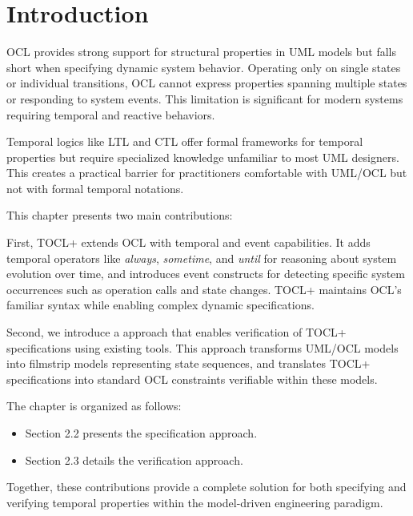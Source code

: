 \section{Introduction}

\hspace{1cm} OCL provides strong support for structural properties in UML models but 
falls short when specifying dynamic system behavior. Operating only on single states 
or individual transitions, OCL cannot express properties spanning multiple states or 
responding to system events. This limitation is significant for modern systems 
requiring temporal and reactive behaviors.

Temporal logics like LTL and CTL offer formal frameworks for temporal properties but 
require specialized knowledge unfamiliar to most UML designers. This creates a practical 
barrier for practitioners comfortable with UML/OCL but not with formal temporal notations.

This chapter presents two main contributions:

First, TOCL+ extends OCL with temporal and event capabilities. It adds temporal 
operators like \textit{always}, \textit{sometime}, and \textit{until} for reasoning 
about system evolution over time, and introduces event constructs for detecting 
specific system occurrences such as operation calls and state changes. TOCL+ maintains 
OCL's familiar syntax while enabling complex dynamic specifications.

Second, we introduce a approach that enables verification of TOCL+ 
specifications using existing tools. This approach transforms UML/OCL models into 
filmstrip models representing state sequences, and translates TOCL+ specifications 
into standard OCL constraints verifiable within these models.

The chapter is organized as follows:
\begin{itemize}
    \item Section 2.2 presents the specification approach.
    
    \item Section 2.3 details the verification approach.
\end{itemize}

Together, these contributions provide a complete solution for both specifying and 
verifying temporal properties within the model-driven engineering paradigm.